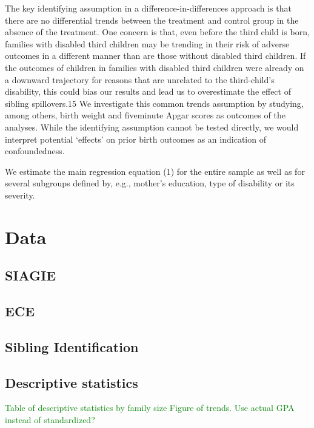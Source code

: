 The key identifying assumption in a difference-in-differences approach is that there are no differential trends between the treatment and control group in the absence of the treatment. One concern is that, even before the third child is born, families with disabled third children may be trending in their risk of adverse outcomes in a different manner than are those without disabled third children. If the outcomes of children in families with disabled third children were already on a downward trajectory for reasons that are unrelated to the third-child’s disability, this could bias our results and lead us to overestimate the effect of sibling spillovers.15 We investigate this common trends assumption by studying, among others, birth weight and fiveminute Apgar scores as outcomes of the analyses. While the identifying assumption cannot be tested directly, we would interpret potential ‘effects’ on prior birth outcomes as an indication of confoundedness. 

We estimate the main regression equation (1) for the entire sample as well as for several subgroups defined by, e.g., mother’s education, type of disability or its severity.

\section{Data}\label{sec:data}

\subsection{SIAGIE}

\subsection{ECE}

\subsection{Sibling Identification}

\subsection{Descriptive statistics}

\textcolor{green}{Table of descriptive statistics by family size}
\textcolor{green}{Figure of trends. Use actual GPA instead of standardized?}

